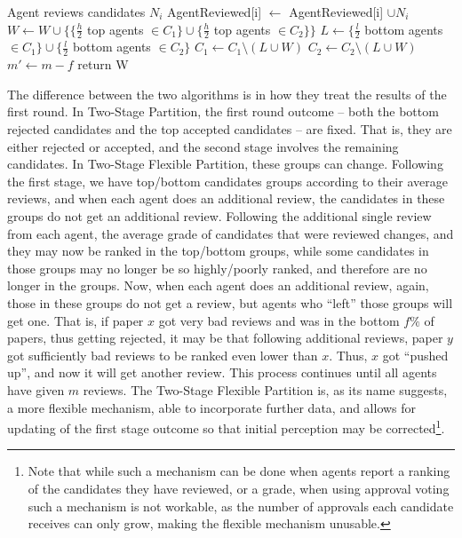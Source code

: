 \documentclass[letterpaper]{article} %
\newcommand{\omer}[1]{\textcolor{red}{\textbf{Omer Says:} #1 }}
\newcommand{\oshri}[1]{\textcolor{blue}{\textbf{Oshri Says:} #1 }}
\begin{document}
\begin{algorithm}[t]
\begin{algorithmic}[1]
 \State Agent reviews candidates $N_{i}$ %
 \State AgentReviewed[i] $\gets$ AgentReviewed[i] $\cup N_{i}$
 \EndFor
 \State $W \gets W \cup \{ \{ \frac{h}{2}$ top agents $\in C_{1} \} \cup \{ \frac{h}{2}$ top agents $\in C_{2} \} \}$
 \State $L \gets \{ \frac{l}{2}$ bottom agents $\in C_{1} \} \cup \{ \frac{l}{2}$ bottom agents $\in C_{2} \}$
 \State $C_{1}\gets C_{1}\setminus (L\cup W)$
 \State $C_{2}\gets C_{2}\setminus (L\cup W)$
 \State $m' \gets m-f$
\EndFor
\State return W
\end{algorithmic}
\end{algorithm}
\normalsize

The difference between the two algorithms is in how they treat the results of the first round. In Two-Stage Partition, the first round outcome -- both the bottom rejected candidates and the top accepted candidates -- are fixed. That is, they are either rejected or accepted, and the second stage involves the remaining candidates. In Two-Stage Flexible Partition, these groups can change. Following the first stage, we have top/bottom candidates groups according to their average reviews, and when each agent does an additional review, the candidates in these groups do not get an additional review. Following the additional single review from each agent, the average grade of candidates that were reviewed changes, and they may now be ranked in the top/bottom groups, while some candidates in those groups may no longer be so highly/poorly ranked, and therefore are no longer in the groups. Now, when each agent does an additional review, again, those in these groups do not get a review, but agents who ``left'' those groups will get one. That is, if paper $x$ got very bad reviews and was in the bottom $f\%$ of papers, thus getting rejected, it may be that following additional reviews, paper $y$ got sufficiently bad reviews to be ranked even lower than $x$. Thus, $x$ got ``pushed up'', and now it will get another review. This process continues until all agents have given $m$ reviews.
The Two-Stage Flexible Partition is, as its name suggests, a more flexible mechanism, able to incorporate further data, and allows for updating of the first stage outcome so that initial perception may be corrected\footnote{Note that while such a mechanism can be done when agents report a ranking of the candidates they have reviewed, or a grade, when using approval voting such a mechanism is not workable, as the number of approvals each candidate receives can only grow, making the flexible mechanism unusable.}.
\end{document}
